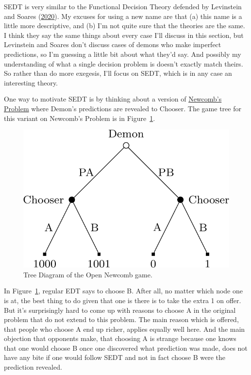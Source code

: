 \documentclass[
  12pt,
  letterpaper,
  DIV=11,
  numbers=noendperiod]{scrreprt}
\begin{document}
SEDT is very similar to the Functional Decision Theory defended by
Levinstein and Soares
(\protect\hyperlink{ref-LevinsteinSoares2020}{2020}). My excuses for
using a new name are that (a) this name is a little more descriptive,
and (b) I'm not quite sure that the theories are the same. I think they
say the same things about every case I'll discuss in this section, but
Levinstein and Soares don't discuss cases of demons who make imperfect
predictions, so I'm guessing a little bit about what they'd say. And
possibly my understanding of what a single decision problem is doesn't
exactly match theirs. So rather than do more exegesis, I'll focus on
SEDT, which is in any case an interesting theory.

One way to motivate SEDT is by thinking about a version of
\protect\hyperlink{tbl-newcomb}{Newcomb's Problem} where Demon's
predictions are revealed to Chooser. The game tree for this variant on
Newcomb's Problem is in Figure~\ref{fig-open-newcomb}.

\begin{figure}

{\centering \includegraphics{dual_files/figure-pdf/fig-open-newcomb-1.png}

}

\caption{\label{fig-open-newcomb}Tree Diagram of the Open Newcomb game.}

\end{figure}

In Figure~\ref{fig-open-newcomb}, regular EDT says to choose B. After
all, no matter which node one is at, the best thing to do given that one
is there is to take the extra 1 on offer. But it's surprisingly hard to
come up with reasons to choose A in the original problem that do not
extend to this problem. The main reason which is offered, that people
who choose A end up richer, applies equally well here. And the main
objection that opponents make, that choosing A is strange because one
knows that one would choose B once one discovered what prediction was
made, does not have any bite if one would follow SEDT and not in fact
choose B were the prediction revealed.
\end{document}
